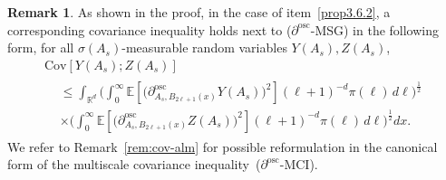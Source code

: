 \documentclass[11pt]{article}
\theoremstyle{definition}
\newtheorem{rema}[theo]{Remark}
\numberwithin{equation}{section}
\numberwithin{figure}{section}
\numberwithin{table}{section}
\newcommand{\R}{\mathbb R}
\newcommand{\expec}[1]{\mathbb{E}\left[#1 \right]}
\newcommand{\osc}{\partial^{\mathrm{osc}}}
\newcommand{\oscd}[1]{\mathrel{\osc_{#1}}}
\newcommand{\cov}[2]{\mathrm{Cov}\left[#1;#2\right]}
\begin{document}
\begin{rema}
As shown in the proof, in the case of item~\eqref{prop3.6.2}, a corresponding covariance inequality holds next to ($\osc$-MSG) in the following form, for all $\sigma(A_s)$-measurable random variables $Y(A_s),Z(A_s)$,
\begin{multline}\label{eq:MSG-RPM}
\cov{Y(A_s)}{Z(A_s)}\\
\begin{aligned}
&\le \int_{\R^d}\bigg(\int_0^\infty\expec{\Big(\oscd{A_s,B_{2\ell+1}(x)}Y(A_s)\Big)^2}(\ell+1)^{-d}\pi(\ell)\,d\ell\bigg)^\frac12\\
&\times\bigg(\int_0^\infty\expec{\Big(\oscd{A_s,B_{2\ell+1}(x)}Z(A_s)\Big)^2}(\ell+1)^{-d}\pi(\ell)\,d\ell\bigg)^\frac12dx.
\end{aligned}
\end{multline}
We refer to Remark~\ref{rem:cov-alm} for possible reformulation in the canonical form of the multiscale covariance inequality~($\osc$-MCI).
\end{rema}
\end{document}
